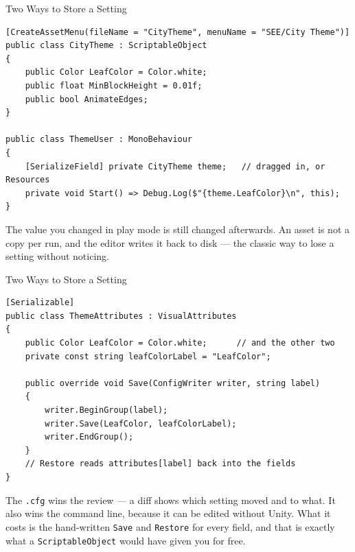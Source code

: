 \begin{solutionframe}{Two Ways to Store a Setting}
  \begin{lstlisting}[basicstyle=\scriptsize\ttfamily]
[CreateAssetMenu(fileName = "CityTheme", menuName = "SEE/City Theme")]
public class CityTheme : ScriptableObject
{
    public Color LeafColor = Color.white;
    public float MinBlockHeight = 0.01f;
    public bool AnimateEdges;
}

public class ThemeUser : MonoBehaviour
{
    [SerializeField] private CityTheme theme;   // dragged in, or Resources
    private void Start() => Debug.Log($"{theme.LeafColor}\n", this);
}
  \end{lstlisting}
  \vspace{1ex}

  The value you changed in play mode is still changed afterwards. An asset is
  not a copy per run, and the editor writes it back to disk --- the classic
  way to lose a setting without noticing.
\end{solutionframe}

\begin{solutionframe}{Two Ways to Store a Setting}
  \begin{lstlisting}[basicstyle=\scriptsize\ttfamily]
[Serializable]
public class ThemeAttributes : VisualAttributes
{
    public Color LeafColor = Color.white;      // and the other two
    private const string leafColorLabel = "LeafColor";

    public override void Save(ConfigWriter writer, string label)
    {
        writer.BeginGroup(label);
        writer.Save(LeafColor, leafColorLabel);
        writer.EndGroup();
    }
    // Restore reads attributes[label] back into the fields
}
  \end{lstlisting}
  \vspace{0.5ex}

  The \texttt{.cfg} wins the review --- a diff shows which setting moved and to
  what. It also wins the command line, because it can be edited without Unity.
  What it costs is the hand-written \texttt{Save} and \texttt{Restore} for
  every field, and that is exactly what a \texttt{ScriptableObject} would have
  given you for free.
\end{solutionframe}

\endinput


